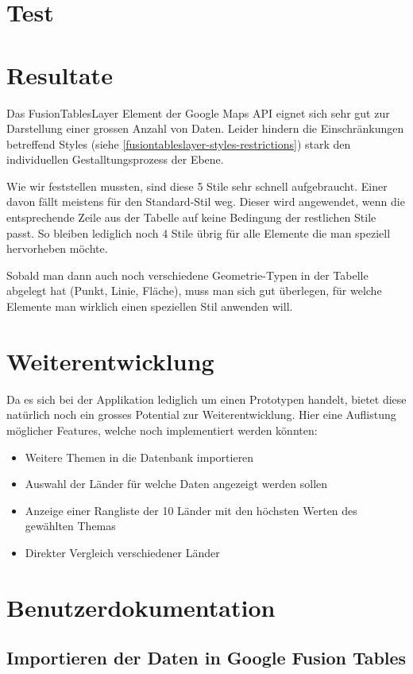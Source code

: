 \section{Test}

\section{Resultate}
Das FusionTablesLayer Element der Google Maps API eignet sich sehr gut zur Darstellung einer grossen Anzahl von Daten. Leider hindern die Einschränkungen betreffend Styles (siehe \ref{fusiontableslayer-styles-restrictions}) stark den individuellen Gestalltungsprozess der Ebene.

Wie wir feststellen mussten, sind diese 5 Stile sehr schnell aufgebraucht. Einer davon fällt meistens für den Standard-Stil weg. Dieser wird angewendet, wenn die entsprechende Zeile aus der Tabelle auf keine Bedingung der restlichen Stile passt. So bleiben lediglich noch 4 Stile übrig für alle Elemente die man speziell hervorheben möchte.

Sobald man dann auch noch verschiedene Geometrie-Typen in der Tabelle abgelegt hat (Punkt, Linie, Fläche), muss man sich gut überlegen, für welche Elemente man wirklich einen speziellen Stil anwenden will.

\section{Weiterentwicklung}
Da es sich bei der Applikation lediglich um einen Prototypen handelt, bietet diese natürlich noch ein grosses Potential zur Weiterentwicklung. Hier eine Auflistung möglicher Features, welche noch implementiert werden könnten:

\begin{itemize}
\item Weitere Themen in die Datenbank importieren
\item Auswahl der Länder für welche Daten angezeigt werden sollen
\item Anzeige einer Rangliste der 10 Länder mit den höchsten Werten des gewählten Themas
\item Direkter Vergleich verschiedener Länder
\end{itemize}


\section{Benutzerdokumentation}
\subsection{Importieren der Daten in Google Fusion Tables}

